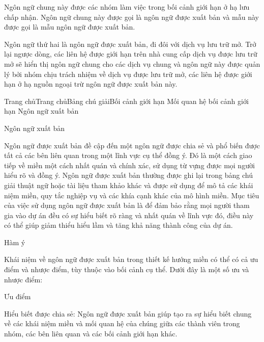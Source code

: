 Ngôn ngữ chung này được các nhóm làm việc trong bối cảnh giới hạn ở hạ lưu chấp nhận. Ngôn ngữ chung này được gọi là ngôn ngữ được xuất bản và mẫu này được gọi là mẫu ngôn ngữ được xuất bản.


Ngôn ngữ thứ hai là ngôn ngữ được xuất bản, đi đôi với dịch vụ lưu trữ mở. Trở lại ngược dòng, các liên hệ được giới hạn trên nhà cung cấp dịch vụ được lưu trữ mở sẽ hiển thị ngôn ngữ chung cho các dịch vụ chung và ngôn ngữ này được quản lý bởi nhóm chịu trách nhiệm về dịch vụ được lưu trữ mở, các liên hệ được giới hạn ở hạ nguồn ngoại trừ ngôn ngữ được xuất bản này.






Trang chủTrang chủBảng chú giảiBối cảnh giới hạn Mối quan hệ bối cảnh giới hạn Ngôn ngữ xuất bản

Ngôn ngữ xuất bản

Ngôn ngữ được xuất bản đề cập đến một ngôn ngữ được chia sẻ và phổ biến được tất cả các bên liên quan trong một lĩnh vực cụ thể đồng ý. Đó là một cách giao tiếp về miền một cách nhất quán và chính xác, sử dụng từ vựng được mọi người hiểu rõ và đồng ý. Ngôn ngữ được xuất bản thường được ghi lại trong bảng chú giải thuật ngữ hoặc tài liệu tham khảo khác và được sử dụng để mô tả các khái niệm miền, quy tắc nghiệp vụ và các khía cạnh khác của mô hình miền. Mục tiêu của việc sử dụng ngôn ngữ được xuất bản là để đảm bảo rằng mọi người tham gia vào dự án đều có sự hiểu biết rõ ràng và nhất quán về lĩnh vực đó, điều này có thể giúp giảm thiểu hiểu lầm và tăng khả năng thành công của dự án.

Hàm ý

Khái niệm về ngôn ngữ được xuất bản trong thiết kế hướng miền có thể có cả ưu điểm và nhược điểm, tùy thuộc vào bối cảnh cụ thể. Dưới đây là một số ưu và nhược điểm:

Ưu điểm

Hiểu biết được chia sẻ: Ngôn ngữ được xuất bản giúp tạo ra sự hiểu biết chung về các khái niệm miền và mối quan hệ của chúng giữa các thành viên trong nhóm, các bên liên quan và các bối cảnh giới hạn khác.

